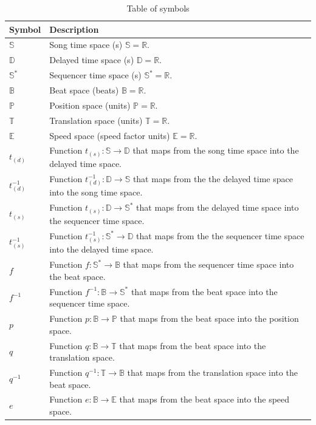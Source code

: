 \documentclass[a4paper,9pt]{article}
\begin{document}
    \begin{table}[htbp]
	    \centering
	    \begin{tabular}{lp{11cm}}
		    Symbol & Description \\\toprule
		    $ \mathbb{S} $ & Song time space (s) $ \mathbb{S} = \mathbb{R} $.\\
		    $ \mathbb{D} $ & Delayed time space (s) $ \mathbb{D} = \mathbb{R} $.\\
		    $ \mathbb{S^{*}} $ & Sequencer time space (s) $ \mathbb{S^{*}} = \mathbb{R} $.\\
		    $ \mathbb{B} $ & Beat space (beats) $ \mathbb{B} = \mathbb{R} $.\\
		    $ \mathbb{P} $ & Position space (units) $ \mathbb{P} = \mathbb{R} $.\\
		    $ \mathbb{T} $ & Translation space (units) $ \mathbb{T} = \mathbb{R} $.\\
		    $ \mathbb{E} $ & Speed space (speed factor units) $ \mathbb{E} = \mathbb{R} $.\\
		    $ t_{(d)} $ & Function  $ t_{(s)}: \mathbb{S}\rightarrow \mathbb{D} $ that maps from the song time space into the delayed time space.\\
	    $ t_{(d)}^{-1} $ & Function  $ t_{(d)}^{-1}: \mathbb{D}\rightarrow \mathbb{S} $ that maps from the the delayed time space into the song time space.\\
		    $ t_{(s)} $ & Function  $ t_{(s)}: \mathbb{D}\rightarrow \mathbb{S^{*}} $ that maps from the delayed time space into the sequencer time space.\\
	    $ t_{(s)}^{-1}$ & Function  $ t_{(s)}^{-1}: \mathbb{S^{*}}\rightarrow \mathbb{D} $ that maps from the the sequencer time space into the delayed time space.\\
		    $ f $ & Function $ f: \mathbb{S^{*}}\rightarrow \mathbb{B} $ that maps from the sequencer time space into the beat space. \\
		    $ f^{-1} $ & Function $ f^{-1}: \mathbb{B}\rightarrow \mathbb{S^{*}} $ that maps from the beat space into the sequencer time space.\\
		    $ p $ & Function $ p: \mathbb{B}\rightarrow \mathbb{P} $ that maps from the beat space into the position space.\\
		    $ q $ & Function $ q: \mathbb{B}\rightarrow \mathbb{T} $ that maps from the beat space into the translation space.\\
		    $ q^{-1} $ & Function $ q^{-1}: \mathbb{T}\rightarrow \mathbb{B} $ that maps from the translation space into the beat space.\\
		    $ e $ & Function $ e: \mathbb{B}\rightarrow \mathbb{E} $ that maps from the beat space into the speed space.\\
	    \end{tabular}
	    \caption{Table of symbols}
	    \label{tab:symbol-table}
    \end{table}
\end{document}
